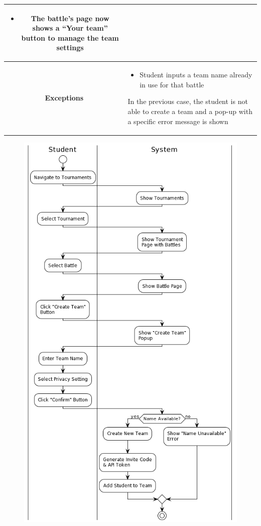 \begin{center}
\begin{tabular}{ |c|m{10cm}| }
\begin{itemize}
            \item The battle’s page now shows a “Your team” button to manage the team settings
        \end{itemize} \\
        \hline
        \textbf{Exceptions} & 
        \begin{itemize}
            \item Student inputs a team name already in use for that battle
        \end{itemize} 
        In the previous case, the student is not able to create a team and a pop-up with a specific error message is shown \\
        \hline
    \end{tabular}
    \begin{figure}[H]
        \hspace{52px}
        \includegraphics[scale=0.5]{Diagrams/activity_createteam.png}

\end{figure}
\end{center}
